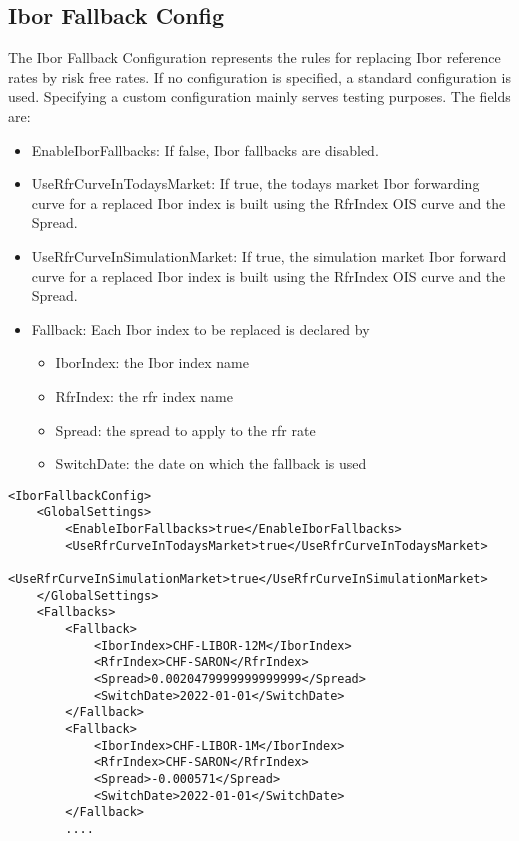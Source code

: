 \subsection{Ibor Fallback Config}
\label{sec:iborfallbackconfig}

The Ibor Fallback Configuration represents the rules for replacing Ibor reference rates by risk free rates. If no
configuration is specified, a standard configuration is used. Specifying a custom configuration mainly serves
testing purposes. The fields are:

\begin{itemize}
\item EnableIborFallbacks: If false, Ibor fallbacks are disabled.
\item UseRfrCurveInTodaysMarket: If true, the todays market Ibor forwarding curve for a replaced Ibor index is built using the RfrIndex OIS curve and the Spread.
\item UseRfrCurveInSimulationMarket: If true, the simulation market Ibor forward curve for a replaced Ibor index is built using the RfrIndex OIS curve and the Spread.
\item Fallback: Each Ibor index to be replaced is declared by
  \begin{itemize}
  \item IborIndex: the Ibor index name
  \item RfrIndex: the rfr index name
  \item Spread: the spread to apply to the rfr rate
  \item SwitchDate: the date on which the fallback is used
  \end{itemize}
\end{itemize}

\begin{verbatim}
<IborFallbackConfig>
	<GlobalSettings>
		<EnableIborFallbacks>true</EnableIborFallbacks>
		<UseRfrCurveInTodaysMarket>true</UseRfrCurveInTodaysMarket>
		<UseRfrCurveInSimulationMarket>true</UseRfrCurveInSimulationMarket>
	</GlobalSettings>
	<Fallbacks>
		<Fallback>
			<IborIndex>CHF-LIBOR-12M</IborIndex>
			<RfrIndex>CHF-SARON</RfrIndex>
			<Spread>0.0020479999999999999</Spread>
			<SwitchDate>2022-01-01</SwitchDate>
		</Fallback>
		<Fallback>
			<IborIndex>CHF-LIBOR-1M</IborIndex>
			<RfrIndex>CHF-SARON</RfrIndex>
			<Spread>-0.000571</Spread>
			<SwitchDate>2022-01-01</SwitchDate>
        </Fallback>
        ....
\end{verbatim}
